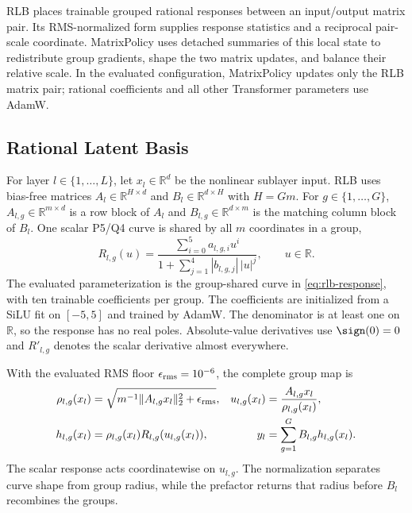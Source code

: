 \documentclass{article}
\begin{document}
RLB places trainable grouped rational responses between an input/output matrix
pair.  Its RMS-normalized form supplies response statistics and a reciprocal
pair-scale coordinate.  MatrixPolicy uses detached summaries of this local state
to redistribute group gradients, shape the two matrix updates, and balance their
relative scale.  In the evaluated configuration, MatrixPolicy updates only the
RLB matrix pair; rational coefficients and all other Transformer parameters use
AdamW.

\subsection{Rational Latent Basis}
\label{sec:method-rlb}

For layer $l\in\{1,\ldots,L\}$, let $x_l\in\mathbb{R}^{d}$ be the nonlinear
sublayer input.  RLB uses bias-free matrices
$A_l\in\mathbb{R}^{H\times d}$ and $B_l\in\mathbb{R}^{d\times H}$ with
$H=Gm$.  For $g\in\{1,\ldots,G\}$, $A_{l,g}\in\mathbb{R}^{m\times d}$ is a
row block of $A_l$ and $B_{l,g}\in\mathbb{R}^{d\times m}$ is the matching
column block of $B_l$.  One scalar P5/Q4 curve is shared by all $m$ coordinates
in a group,
\begin{equation}
    R_{l,g}(u)
    =
    \frac{\sum_{i=0}^{5}a_{l,g,i}u^i}
    {1+\sum_{j=1}^{4}|b_{l,g,j}|\,|u|^j},
    \qquad u\in\mathbb R.
    \label{eq:rlb-response}
\end{equation}
The evaluated parameterization is the group-shared curve in
\eqref{eq:rlb-response}, with ten trainable coefficients per group.  The
coefficients are initialized from a SiLU fit on $[-5,5]$ and trained by AdamW.
The denominator is at least one on $\mathbb R$, so the response has no real
poles.  Absolute-value derivatives use $\sign(0)=0$ and $R'_{l,g}$ denotes the
scalar derivative almost everywhere.

With the evaluated RMS floor $\epsilon_{\rm rms}=10^{-6}$, the complete group
map is
\begin{equation}
\begin{aligned}
    \rho_{l,g}(x_l)
    &=
    \sqrt{m^{-1}\lVert A_{l,g}x_l\rVert_2^2+\epsilon_{\rm rms}},
    &
    u_{l,g}(x_l)
    &=
    \frac{A_{l,g}x_l}{\rho_{l,g}(x_l)},
    \\
    h_{l,g}(x_l)
    &=
    \rho_{l,g}(x_l)R_{l,g}(u_{l,g}(x_l)),
    &
    y_l
    &=
    \sum_{g=1}^{G}B_{l,g}h_{l,g}(x_l).
\end{aligned}
    \label{eq:rlb-forward}
\end{equation}
The scalar response acts coordinatewise on $u_{l,g}$.  The normalization
separates curve shape from group radius, while the prefactor returns that radius
before $B_l$ recombines the groups.
\end{document}
